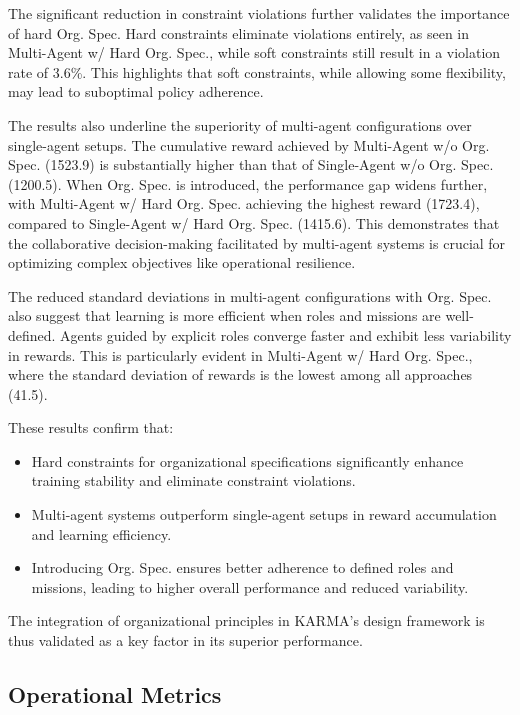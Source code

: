 \documentclass[conference]{IEEEtran}
\begin{document}
The significant reduction in constraint violations further validates the importance of hard Org. Spec. Hard constraints eliminate violations entirely, as seen in Multi-Agent w/ Hard Org. Spec., while soft constraints still result in a violation rate of 3.6\%. This highlights that soft constraints, while allowing some flexibility, may lead to suboptimal policy adherence.

The results also underline the superiority of multi-agent configurations over single-agent setups. The cumulative reward achieved by Multi-Agent w/o Org. Spec. (1523.9) is substantially higher than that of Single-Agent w/o Org. Spec. (1200.5). When Org. Spec. is introduced, the performance gap widens further, with Multi-Agent w/ Hard Org. Spec. achieving the highest reward (1723.4), compared to Single-Agent w/ Hard Org. Spec. (1415.6). This demonstrates that the collaborative decision-making facilitated by multi-agent systems is crucial for optimizing complex objectives like operational resilience.

The reduced standard deviations in multi-agent configurations with Org. Spec. also suggest that learning is more efficient when roles and missions are well-defined. Agents guided by explicit roles converge faster and exhibit less variability in rewards. This is particularly evident in Multi-Agent w/ Hard Org. Spec., where the standard deviation of rewards is the lowest among all approaches (41.5).

These results confirm that:
\begin{itemize}
    \item Hard constraints for organizational specifications significantly enhance training stability and eliminate constraint violations.
    \item Multi-agent systems outperform single-agent setups in reward accumulation and learning efficiency.
    \item Introducing Org. Spec. ensures better adherence to defined roles and missions, leading to higher overall performance and reduced variability.
\end{itemize}
The integration of organizational principles in KARMA's design framework is thus validated as a key factor in its superior performance.

\subsection{Operational Metrics}
\label{subsubsec:operational_metrics}
\end{document}
